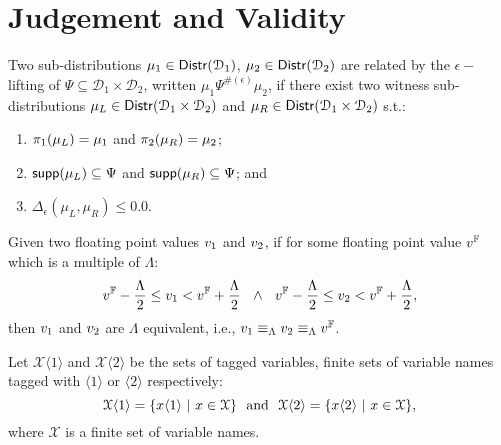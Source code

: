 \documentclass[a4paper,11pt]{article}
\begin{document}
\section{Judgement and Validity}
%
\begin{defn}
\label{def:lifting}
Two sub-distributions $\mu_1 \in \mathsf{Distr}(\mathcal{D}_1)$, $\mu_2 \in \mathsf{Distr}(\mathcal{D}_2)$ are related by the $\epsilon-$lifting of $\Psi \subseteq \mathcal{D}_1 \times \mathcal{D}_2$, written $\mu_1 \Psi^{\#(\epsilon)} \mu_2$, if there exist two witness sub-distributions $\mu_L \in \mathsf{Distr}(\mathcal{D}_1 \times \mathcal{D}_2)$ and $\mu_R \in \mathsf{Distr}(\mathcal{D}_1 \times \mathcal{D}_2)$ s.t.:
\begin{enumerate}
	\item $\pi_1(\mu_L) = \mu_1$ and $\pi_2(\mu_R) = \mu_2$;
	\item $\mathsf{supp}(\mu_L) \subseteq \Psi$ and $\mathsf{supp}(\mu_R) \subseteq \Psi$; and
	\item $\Delta_{\epsilon}(\mu_L, \mu_R) \leq 0.0$.
\end{enumerate}
\end{defn}
%
%
\begin{defn}
Given two floating point values $v_1$ and $v_2$, if for some floating point value $v^{\mathbb{F}}$ which is a multiple of $\Lambda$:
\[
	v^{\mathbb{F}} - \frac{\Lambda}{2} \leq v_1 < v^{\mathbb{F}} + \frac{\Lambda}{2}
	~~
	\land
	~~
	v^{\mathbb{F}} - \frac{\Lambda}{2} \leq v_2 < v^{\mathbb{F}} + \frac{\Lambda}{2},	
\]
then $v_1$ and $v_2$ are $\Lambda$ equivalent, i.e., 
$v_1 \equiv_{\Lambda} v_2 \equiv_{\Lambda} v^{\mathbb{F}}$.
\end{defn}
%
%
\begin{defn}
Let $\mathcal{X}\langle 1 \rangle$ and $\mathcal{X}\langle 2 \rangle$ be the sets of tagged variables, finite sets of variable names tagged with $\langle 1 \rangle$ or $\langle 2 \rangle$ respectively:
\[
	\mathcal{X}\langle 1 \rangle = \{x\langle 1 \rangle ~|~ x \in \mathcal{X}\}
	~~
	\text{and}
	~~
	\mathcal{X}\langle 2 \rangle = \{x\langle 2 \rangle ~|~ x \in \mathcal{X}\},
\]
where $\mathcal{X}$ is a finite set of variable names.
\end{defn}
%
\end{document}
